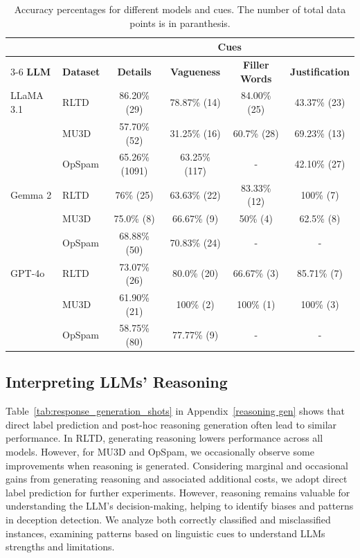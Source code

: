 \begin{table}
    \centering
    \small
    \begin{tabular}{llcccc}
        \toprule
        \multicolumn{2}{c}{} & \multicolumn{4}{c}{\textbf{Cues}} \\
        \cmidrule(lr){3-6}
        \textbf{LLM} & \textbf{Dataset} & \textbf{Details} & \textbf{Vagueness} & \textbf{Filler Words} & \textbf{Justification} \\
        \midrule
        LLaMA 3.1 & RLTD & 86.20\% (29) & 78.87\% (14) & 84.00\% (25) & 43.37\% (23) \\
        & MU3D & 57.70\% (52) & 31.25\% (16) & 60.7\% (28) & 69.23\% (13) \\
        & OpSpam & 65.26\% (1091) & 63.25\% (117) & - & 42.10\% (27) \\
        \midrule
        Gemma 2 & RLTD & 76\% (25) & 63.63\% (22) & 83.33\% (12) & 100\% (7) \\
        & MU3D & 75.0\% (8) & 66.67\% (9) & 50\% (4) & 62.5\% (8) \\
        & OpSpam & 68.88\% (50) & 70.83\% (24) & - & - \\
        \midrule
        GPT-4o & RLTD & 73.07\% (26) & 80.0\% (20) & 66.67\% (3) & 85.71\% (7) \\
        & MU3D & 61.90\% (21) & 100\% (2) & 100\% (1) & 100\% (3) \\
        & OpSpam & 58.75\% (80) & 77.77\% (9) & - & - \\
        \bottomrule
    \end{tabular}
    \captionsetup{justification=centering}
    \caption{Accuracy percentages for different models and cues. The number of total data points is in paranthesis.}
    \label{tab:cues}
\end{table}

\subsection{Interpreting LLMs' Reasoning}

Table~\ref{tab:response_generation_shots} in Appendix~\ref{reasoning gen} shows that direct label prediction and post-hoc reasoning generation often lead to similar performance. In RLTD, generating reasoning lowers performance across all models. However, for MU3D and OpSpam, we occasionally observe some improvements when reasoning is generated. Considering marginal and occasional gains from generating reasoning and associated additional costs, we adopt direct label prediction for further experiments. However, reasoning remains valuable for understanding the LLM’s decision-making, helping to identify biases and patterns in deception detection. We analyze both correctly classified and misclassified instances, examining patterns based on linguistic cues to understand LLMs strengths and limitations.

